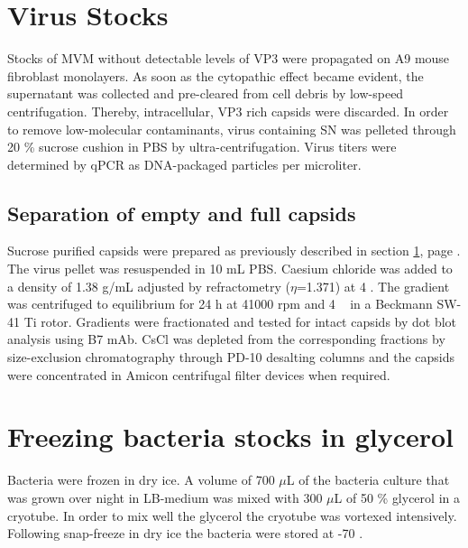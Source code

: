 
\section{Virus Stocks}
\label{Virus Stocks}
Stocks of MVM without detectable levels of VP3 were propagated on A9 mouse fibroblast monolayers. As soon as the cytopathic effect became evident, the supernatant was collected and pre-cleared from cell debris by low-speed centrifugation. Thereby, intracellular, VP3 rich capsids were discarded. In order to remove low-molecular contaminants, virus containing SN was pelleted through 20 \% sucrose cushion in PBS by ultra-centrifugation. Virus titers were determined by qPCR   as DNA-packaged particles per microliter.   

\subsection{Separation of empty and full capsids}

Sucrose purified capsids were prepared as previously described in section \ref{Virus Stocks}, page \pageref{Virus Stocks}. The virus pellet was resuspended in 10 mL PBS. Caesium chloride was added to a density of 1.38 g/mL adjusted by refractometry ($\eta$=1.371) at 4 \textcelsius. The gradient was centrifuged to equilibrium for 24 h at 41000 rpm and 4 \textcelsius~ in a Beckmann SW-41 Ti rotor. Gradients were fractionated and tested for intact capsids by dot blot analysis using B7 mAb. CsCl was depleted from the corresponding fractions by size-exclusion chromatography through PD-10 desalting columns and the capsids were concentrated in Amicon\textsuperscript{\textregistered} centrifugal filter devices when required.          
   
   








\section{Freezing bacteria stocks in glycerol}
Bacteria were frozen in dry ice. A volume of 700 $\mu$L of the bacteria culture that was grown over night in LB-medium was mixed with 300 $\mu$L of 50 \% glycerol in a cryotube. In order to mix well the glycerol the cryotube was vortexed intensively. Following snap-freeze in dry ice the bacteria were stored at -70 \textcelsius.



